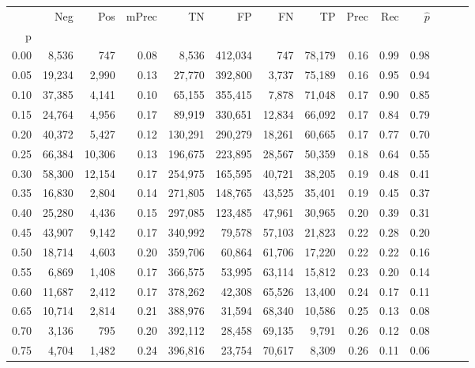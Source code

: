 \begin{tabular}{rrrrrrrrrrrrrr}
\toprule
{} &     Neg &     Pos & mPrec &       TN &       FP &      FN &      TP &  Prec &   Rec & $\hat{p}$ \\
p    &         &         &       &          &          &         &         &       &       &           \\
\midrule
0.00 &   8,536 &     747 &  0.08 &    8,536 &  412,034 &     747 &  78,179 &  0.16 &  0.99 &      0.98 \\
0.05 &  19,234 &   2,990 &  0.13 &   27,770 &  392,800 &   3,737 &  75,189 &  0.16 &  0.95 &      0.94 \\
0.10 &  37,385 &   4,141 &  0.10 &   65,155 &  355,415 &   7,878 &  71,048 &  0.17 &  0.90 &      0.85 \\
0.15 &  24,764 &   4,956 &  0.17 &   89,919 &  330,651 &  12,834 &  66,092 &  0.17 &  0.84 &      0.79 \\
0.20 &  40,372 &   5,427 &  0.12 &  130,291 &  290,279 &  18,261 &  60,665 &  0.17 &  0.77 &      0.70 \\
0.25 &  66,384 &  10,306 &  0.13 &  196,675 &  223,895 &  28,567 &  50,359 &  0.18 &  0.64 &      0.55 \\
0.30 &  58,300 &  12,154 &  0.17 &  254,975 &  165,595 &  40,721 &  38,205 &  0.19 &  0.48 &      0.41 \\
0.35 &  16,830 &   2,804 &  0.14 &  271,805 &  148,765 &  43,525 &  35,401 &  0.19 &  0.45 &      0.37 \\
0.40 &  25,280 &   4,436 &  0.15 &  297,085 &  123,485 &  47,961 &  30,965 &  0.20 &  0.39 &      0.31 \\
0.45 &  43,907 &   9,142 &  0.17 &  340,992 &   79,578 &  57,103 &  21,823 &  0.22 &  0.28 &      0.20 \\
0.50 &  18,714 &   4,603 &  0.20 &  359,706 &   60,864 &  61,706 &  17,220 &  0.22 &  0.22 &      0.16 \\
0.55 &   6,869 &   1,408 &  0.17 &  366,575 &   53,995 &  63,114 &  15,812 &  0.23 &  0.20 &      0.14 \\
0.60 &  11,687 &   2,412 &  0.17 &  378,262 &   42,308 &  65,526 &  13,400 &  0.24 &  0.17 &      0.11 \\
0.65 &  10,714 &   2,814 &  0.21 &  388,976 &   31,594 &  68,340 &  10,586 &  0.25 &  0.13 &      0.08 \\
0.70 &   3,136 &     795 &  0.20 &  392,112 &   28,458 &  69,135 &   9,791 &  0.26 &  0.12 &      0.08 \\
0.75 &   4,704 &   1,482 &  0.24 &  396,816 &   23,754 &  70,617 &   8,309 &  0.26 &  0.11 &      0.06 \\

\end{tabular}
